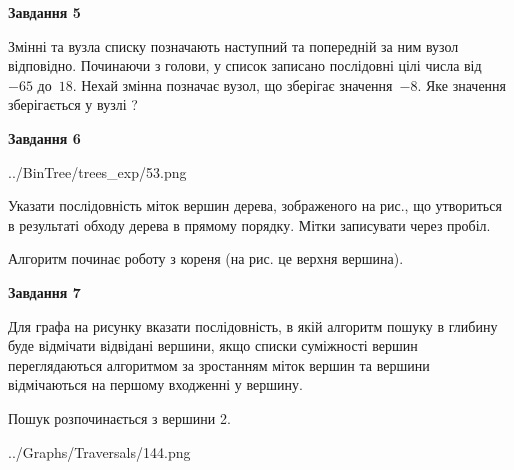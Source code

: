 \documentclass[12pt, ukrainian]{article}
\begin{document}
{\begin {large}
{\begin {center}\textbf{Завдання 5}\end {center}}\par
Змінні  та  вузла списку позначають наступний та попередній за ним вузол відповідно. Починаючи з голови, у список записано послідовні цілі числа від~$-65$ до~$18$. Нехай змінна  позначає вузол, що зберігає значення~$-8$.
Яке значення зберігається у вузлі  ?\par
\newpage

{\begin {center}\textbf{Завдання 6}\end {center}}\par

\begin{center}
	{../BinTree/trees_exp/53.png}
\end{center}
Указати послідовність міток вершин дерева, зображеного на рис., що утвориться в результаті обходу дерева в прямому порядку. Мітки записувати через пробіл.\par Алгоритм починає роботу з кореня (на рис. це верхня вершина).\par
\newpage

{\begin {center}\textbf{Завдання 7}\end {center}}\par
Для графа на рисунку вказати послідовність, в якій алгоритм пошуку в глибину буде відмічати відвідані вершини, якщо списки суміжності вершин переглядаються алгоритмом за зростанням міток вершин та вершини відмічаються на першому вход\-женні у вершину.\par
Пошук розпочинається з вершини 2.\par

\begin{center}
	{../Graphs/Traversals/144.png}
\end{center}\par
\newpage


\end{large}}
\end{document}
